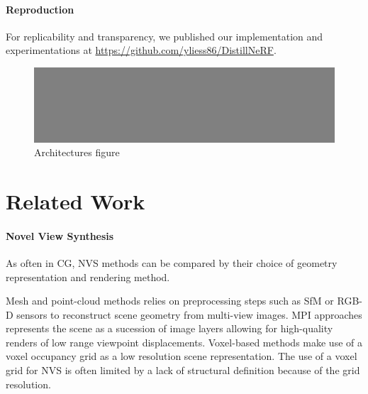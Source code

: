 \paragraph{Reproduction}
For replicability and transparency, we published our implementation and experimentations at \url{https://github.com/yliess86/DistillNeRF}.

\begin{figure}[ht]
    \includegraphics[width=\textwidth]{imgs/teaser.png}
    \caption{Architectures figure}
    \label{fig:architectures}
\end{figure}

\glsresetall
\section{Related Work}

\paragraph{Novel View Synthesis}

As often in \gls{CG}, \gls{NVS} methods can be compared by their choice of geometry representation and rendering method.

Mesh  and point-cloud  methods relies on preprocessing steps such as \gls{SfM} or RGB-D sensors to reconstruct scene geometry from multi-view images. \gls{MPI} approaches  represents the scene as a sucession of image layers allowing for high-quality renders of low range viewpoint displacements. Voxel-based methods  make use of a voxel occupancy grid as a low resolution scene representation. The use of a voxel grid for \gls{NVS} is often limited by a lack of structural definition because of the grid resolution.

